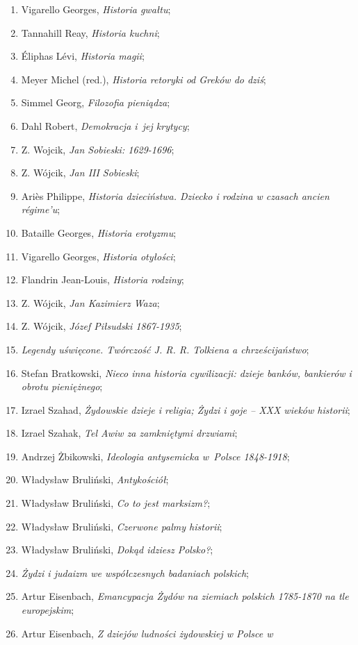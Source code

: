 \documentclass[a4paper,11pt]{article}
\begin{document}
\begin{enumerate}
\item Vigarello Georges, \emph{Historia gwałtu};
\item Tannahill Reay, \emph{Historia kuchni};
\item Éliphas Lévi, \emph{Historia magii};
\item Meyer Michel (red.), \emph{Historia retoryki od Greków do dziś};
\item Simmel Georg, \emph{Filozofia pieniądza};
\item Dahl Robert, \emph{Demokracja i~jej krytycy};
\item Z. Wojcik, \emph{Jan Sobieski: 1629-1696};
\item Z. Wójcik, \emph{Jan III Sobieski};
\item Ariès Philippe, \emph{Historia dzieciństwa. Dziecko i rodzina w
    czasach ancien régime’u};
\item Bataille Georges, \emph{Historia erotyzmu};
\item Vigarello Georges, \emph{Historia otyłości};
\item Flandrin Jean-Louis, \emph{Historia rodziny};
\item Z. Wójcik, \emph{Jan Kazimierz Waza};
\item Z. Wójcik, \emph{Józef Piłsudski 1867-1935};
\item \emph{Legendy uświęcone. Twórczość J. R. R. Tolkiena a
    chrześcijaństwo};
\item Stefan Bratkowski, \emph{Nieco inna historia cywilizacji: dzieje
    banków, bankierów i obrotu pieniężnego};
\item Izrael Szahad, \emph{Żydowskie dzieje i religia; Żydzi i goje –
    XXX wieków historii};
\item Izrael Szahak, \emph{Tel Awiw za zamkniętymi drzwiami};
\item Andrzej Żbikowski, \emph{Ideologia antysemicka w~Polsce
    1848-1918};
\item Władysław Bruliński, \emph{Antykościół};
\item Władysław Bruliński, \emph{Co to jest marksizm?};
\item Władysław Bruliński, \emph{Czerwone palmy historii};
\item Władysław Bruliński, \emph{Dokąd idziesz Polsko?};
\item \emph{Żydzi i judaizm we współczesnych badaniach polskich};
\item Artur Eisenbach, \emph{Emancypacja Żydów na ziemiach polskich
    1785-1870 na tle europejskim};
\item Artur Eisenbach, \emph{Z dziejów ludności żydowskiej w Polsce w
}
\end{enumerate}
\end{document}
